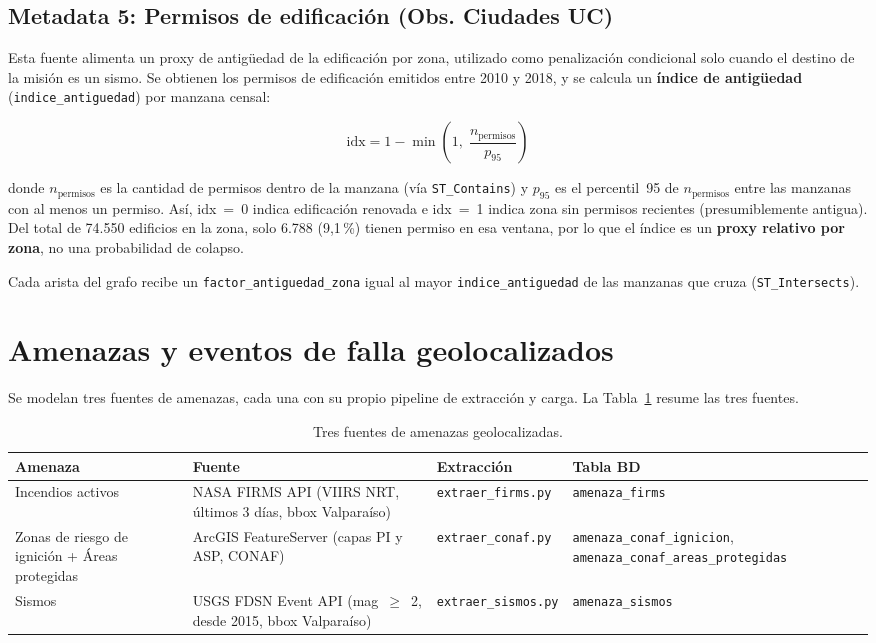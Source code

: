 \documentclass[conference]{IEEEtran}
\begin{document}
\subsection{Metadata 5: Permisos de edificación (Obs. Ciudades UC)}

Esta fuente alimenta un proxy de antigüedad de la edificación por zona, utilizado como penalización condicional solo cuando el destino de la misión es un sismo. Se obtienen los permisos de edificación emitidos entre 2010 y 2018, y se calcula un \textbf{índice de antigüedad} (\texttt{indice\_antiguedad}) por manzana censal:

\begin{equation}
\text{idx} = 1 - \min\!\left(1,\; \frac{n_{\text{permisos}}}{p_{95}}\right)
\label{eq:idx}
\end{equation}

donde $n_{\text{permisos}}$ es la cantidad de permisos dentro de la manzana (vía \texttt{ST\_Contains}) y $p_{95}$ es el percentil~95 de $n_{\text{permisos}}$ entre las manzanas con al menos un permiso. Así, idx~=~0 indica edificación renovada e idx~=~1 indica zona sin permisos recientes (presumiblemente antigua). Del total de 74.550 edificios en la zona, solo 6.788 (9,1\,\%) tienen permiso en esa ventana, por lo que el índice es un \textbf{proxy relativo por zona}, no una probabilidad de colapso.

Cada arista del grafo recibe un \texttt{factor\_antiguedad\_zona} igual al mayor \texttt{indice\_antiguedad} de las manzanas que cruza (\texttt{ST\_Intersects}).


\section{Amenazas y eventos de falla geolocalizados}
\label{sec:amenazas}

Se modelan tres fuentes de amenazas, cada una con su propio pipeline de extracción y carga. La Tabla~\ref{tab:amenazas} resume las tres fuentes.

\begin{table}[!htbp]
\centering
\caption{Tres fuentes de amenazas geolocalizadas.}
\label{tab:amenazas}
\scriptsize
\begin{tabularx}{\columnwidth}{lXll}
\toprule
\textbf{Amenaza} & \textbf{Fuente} & \textbf{Extracción} & \textbf{Tabla BD} \\
\midrule
Incendios activos & NASA FIRMS API (VIIRS NRT, últimos 3 días, bbox Valparaíso) & \texttt{extraer\_firms.py} & \texttt{amenaza\_firms} \\
Zonas de riesgo de ignición + Áreas protegidas & ArcGIS FeatureServer (capas PI y ASP, CONAF) & \texttt{extraer\_conaf.py} & \texttt{amenaza\_conaf\_ignicion}, \texttt{amenaza\_conaf\_areas\_protegidas} \\
Sismos & USGS FDSN Event API (mag~$\geq$~2, desde 2015, bbox Valparaíso) & \texttt{extraer\_sismos.py} & \texttt{amenaza\_sismos} \\
\bottomrule
\end{tabularx}
\end{table}
\FloatBarrier
\end{document}
